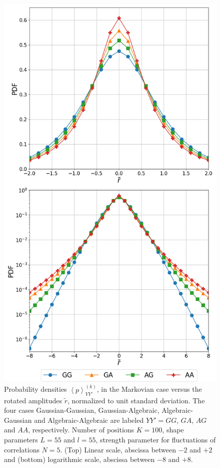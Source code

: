 \begin{figure}[htbp]
    \centering
    \includegraphics[width=\columnwidth]
    {figures/03_distributions_comparison.png}
    \caption{Probability densities $\left\langle p \right\rangle_{YY'}^{\left(k\right)}$,
             in the Markovian case versus the rotated amplitudes $\tilde{r}$,
             normalized to unit standard deviation. The four cases Gaussian-Gaussian,
             Gaussian-Algebraic, Algebraic-Gaussian and Algebraic-Algebraic are
             labeled $YY' = GG$, $GA$, $AG$ and $AA$, respectively. Number of
             positions $K = 100$, shape parameters $L = 55$ and $l = 55$, strength
             parameter for fluctuations of correlations $N = 5$. (Top) Linear scale,
             abscissa between $-2$ and $+2$ and (bottom) logarithmic scale, abscissa
             between $-8$ and $+8$.}
    \label{fig:distributions_comparison}
\end{figure}

